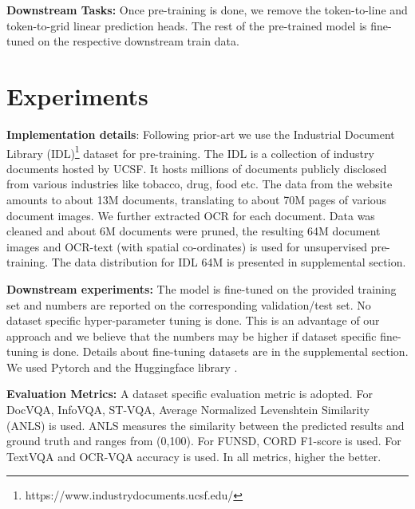 \documentclass[10pt,twocolumn,letterpaper]{article}
\begin{document}
\noindent \textbf{Downstream Tasks:} Once pre-training is done, we remove the token-to-line and token-to-grid linear prediction heads. The rest of the pre-trained model is fine-tuned on the respective downstream train data. 







\section{Experiments}
\label{sec:experiments}


\noindent \textbf{Implementation details}: Following prior-art \cite{appalaraju2021docformer,powalski2021going,biten2022latr,xu2020layoutlm,xu2021layoutlmv2,huang2022layoutlmv3} we use the Industrial Document Library (IDL)\footnote{https://www.industrydocuments.ucsf.edu/} dataset for pre-training. The IDL is a collection of industry documents hosted by UCSF. It hosts millions of documents publicly disclosed from various industries like tobacco, drug, food etc. The data from the website amounts to about 13M documents, translating to about 70M pages of various document images. We further extracted OCR for each document. 
Data was cleaned and about 6M documents were pruned, the resulting 64M document images and OCR-text (with spatial co-ordinates) is used for unsupervised pre-training. The data distribution for IDL 64M is presented in supplemental section.

\noindent \textbf{Downstream experiments:} The model is fine-tuned on the provided training set and numbers are reported on the corresponding validation/test set. No dataset specific hyper-parameter tuning is done. This is an advantage of our approach and we believe that the numbers may be higher if dataset specific fine-tuning is done. Details about fine-tuning datasets are in the supplemental section. We used Pytorch \cite{paszke2019pytorch} and the Huggingface library \cite{wolf2019huggingface}.

\noindent \textbf{Evaluation Metrics:} A dataset specific evaluation metric is adopted. For DocVQA\cite{mathew2020docvqa}, InfoVQA\cite{mathew2022infographicvqa}, ST-VQA\cite{biten2019scene}, Average Normalized Levenshtein Similarity (ANLS) \cite{biten2019icdar} is used. ANLS measures the similarity between the predicted results and ground truth and ranges from (0,100). For FUNSD\cite{Jaume2019FUNSDAD}, CORD\cite{park2019cord} F1-score is used. For TextVQA \cite{singh2019towards} and OCR-VQA\cite{mishra2019ocr}  accuracy is used. In all metrics, higher the better.
\end{document}
